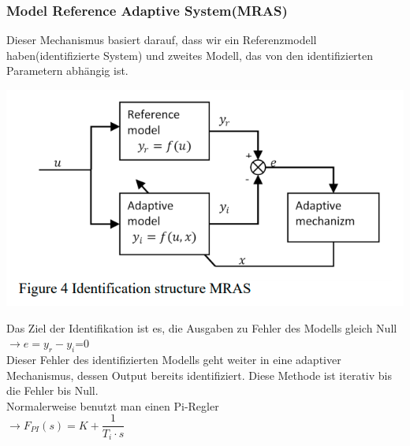 \documentclass[serif,11pt, xcolor=table]{beamer}
\begin{document}
\begin{frame}
	\frametitle{Model Reference Adaptive System(MRAS)}
	\small{Dieser Mechanismus basiert darauf, dass wir ein Referenzmodell haben(identifizierte System) und 
	zweites Modell, das von den identifizierten Parametern abhängig ist.}
	\begin{floatingfigure}[r]{0.38\linewidth}
	\includegraphics[scale=0.30]{Abbildungen/MRAS1.PNG}
	
\end{floatingfigure}
\vskip 0.4cm
\tiny{Das Ziel der Identifikation ist es, die Ausgaben zu Fehler des Modells gleich Null }\\
$\rightarrow e=y_{r}-y_{i}$=0 \\
\vskip 0.2cm
\tiny{Dieser Fehler des identifizierten Modells geht weiter in eine adaptiver Mechanismus, dessen Output bereits identifiziert.} 
\vskip 0.2cm
\tiny{Diese Methode ist iterativ bis die Fehler bis Null.\\ Normalerweise benutzt man einen Pi-Regler }\\
$\rightarrow F_{PI}(s)=K+\dfrac{1}{T_{i} \cdot s}$\\
\end{frame}
\end{document}
